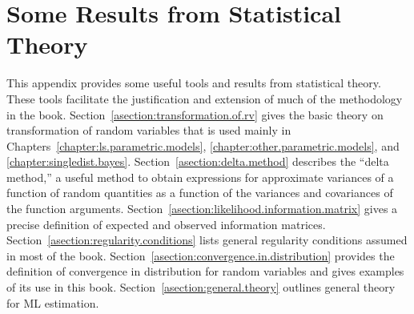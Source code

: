 \chapter{Some Results from Statistical Theory}
This appendix provides some useful tools and results
from statistical theory. These tools facilitate the
justification and extension of much of the methodology in the
book. 
Section~\ref{asection:transformation.of.rv} gives the
basic theory on transformation of random variables that is 
used mainly in Chapters~\ref{chapter:ls.parametric.models},
\ref{chapter:other.parametric.models}, and 
\ref{chapter:singledist.bayes}.
Section~\ref{asection:delta.method} describes the ``delta method,''
a useful method to obtain expressions for approximate variances of a
function of random quantities as a function of the variances and
covariances of the function arguments.
Section~\ref{asection:likelihood.information.matrix} gives a precise
definition of expected and observed information matrices.
Section~\ref{asection:regularity.conditions} lists general
regularity conditions assumed in most of the book.
Section~\ref{asection:convergence.in.distribution} provides the
definition of convergence in distribution for random variables and
gives examples of its use in this book.
Section~\ref{asection:general.theory} outlines general theory for ML
estimation.
